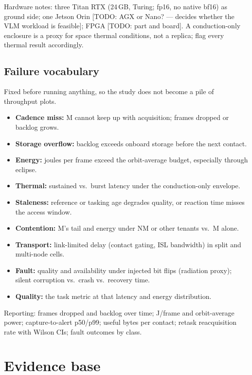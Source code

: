 \documentclass[11pt]{article}
\newcommand{\todo}[1]{\textcolor{blue!60!black}{[TODO: #1]}}
\begin{document}
Hardware notes: three Titan RTX (24\,GB, Turing; fp16, no native bf16) as ground side; one Jetson Orin
\todo{AGX or Nano? --- decides whether the VLM workload is feasible}; FPGA \todo{part and board}. A
conduction-only enclosure is a proxy for space thermal conditions, not a replica; flag every thermal
result accordingly.

\subsection{Failure vocabulary}\label{sec:failures}

Fixed before running anything, so the study does not become a pile of throughput plots.
\begin{itemize}
  \item \textbf{Cadence miss:} M cannot keep up with acquisition; frames dropped or backlog grows.
  \item \textbf{Storage overflow:} backlog exceeds onboard storage before the next contact.
  \item \textbf{Energy:} joules per frame exceed the orbit-average budget, especially through eclipse.
  \item \textbf{Thermal:} sustained vs.\ burst latency under the conduction-only envelope.
  \item \textbf{Staleness:} reference or tasking age degrades quality, or reaction time misses the
        access window.
  \item \textbf{Contention:} M's tail and energy under NM or other tenants vs.\ M alone.
  \item \textbf{Transport:} link-limited delay (contact gating, ISL bandwidth) in split and multi-node cells.
  \item \textbf{Fault:} quality and availability under injected bit flips (radiation proxy); silent
        corruption vs.\ crash vs.\ recovery time.
  \item \textbf{Quality:} the task metric at that latency and energy distribution.
\end{itemize}

Reporting: frames dropped and backlog over time; J/frame and orbit-average power; capture-to-alert
p50/p99; useful bytes per contact; retask reacquisition rate with Wilson CIs; fault outcomes by class.

\section{Evidence base}
\end{document}
